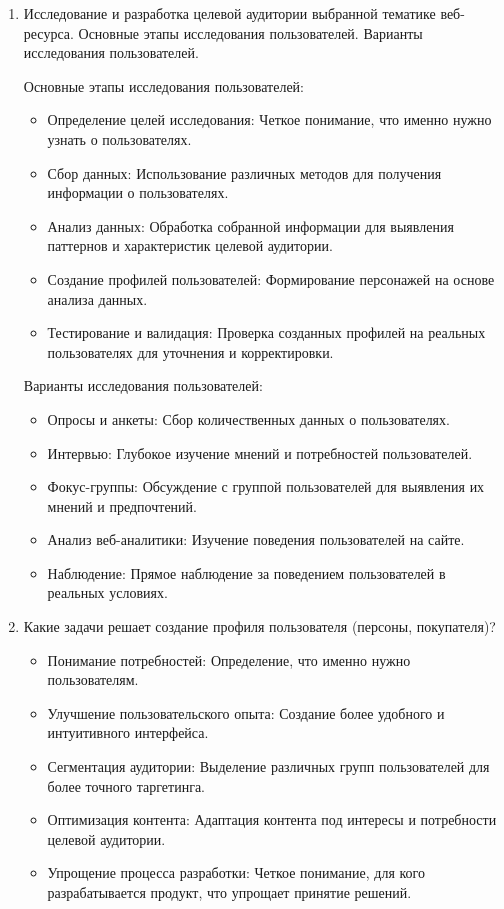 \begin{enumerate}
\item Исследование и разработка целевой аудитории выбранной тематике веб-ресурса. Основные этапы исследования пользователей. Варианты исследования пользователей.
    \bigskip

Основные этапы исследования пользователей:

        \begin{itemize}
            \item Определение целей исследования: Четкое понимание, что именно нужно узнать о пользователях.
            \item Сбор данных: Использование различных методов для получения информации о пользователях.
            \item Анализ данных: Обработка собранной информации для выявления паттернов и характеристик целевой аудитории.
            \item Создание профилей пользователей: Формирование персонажей на основе анализа данных.
            \item Тестирование и валидация: Проверка созданных профилей на реальных пользователях для уточнения и корректировки.
        \end{itemize}
    \bigskip

Варианты исследования пользователей:

        \begin{itemize}
            \item Опросы и анкеты: Сбор количественных данных о пользователях.
            \item Интервью: Глубокое изучение мнений и потребностей пользователей.
            \item Фокус-группы: Обсуждение с группой пользователей для выявления их мнений и предпочтений.
            \item Анализ веб-аналитики: Изучение поведения пользователей на сайте.
            \item Наблюдение: Прямое наблюдение за поведением пользователей в реальных условиях.
        \end{itemize}
\item Какие задачи решает создание профиля пользователя (персоны, покупателя)?

    \begin{itemize}
        \item Понимание потребностей: Определение, что именно нужно пользователям.
        \item Улучшение пользовательского опыта: Создание более удобного и интуитивного интерфейса.
        \item Сегментация аудитории: Выделение различных групп пользователей для более точного таргетинга.
        \item Оптимизация контента: Адаптация контента под интересы и потребности целевой аудитории.
        \item Упрощение процесса разработки: Четкое понимание, для кого разрабатывается продукт, что упрощает принятие решений.
    \end{itemize}


\end{enumerate}
